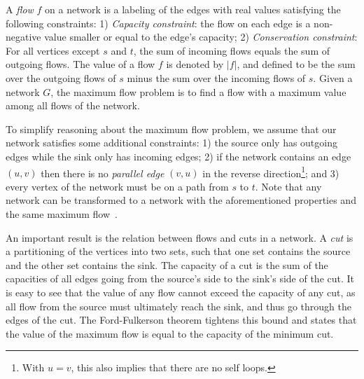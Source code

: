 \documentclass[smallcondensed]{svjour3}     %
\begin{document}
A \emph{flow} $f$ on a network is a labeling of the edges with real values satisfying the following constraints: 1) \emph{Capacity constraint}: the flow on each edge is a non-negative value smaller or equal to the edge's capacity; 2) \emph{Conservation constraint}: For all vertices except $s$ and $t$, the sum of incoming flows equals the 
sum of outgoing flows.
% 
The value of a flow $f$ is denoted by $|f|$, and defined to be the sum over the outgoing flows of $s$ minus the sum over the incoming flows of $s$.
Given a network $G$, the maximum flow problem is to find a flow with a maximum value among all flows of the network. 

To simplify reasoning about the maximum flow problem, we assume that our network satisfies some additional constraints: 1) the source only has outgoing edges while the sink only has incoming edges; 2) if the network contains an edge $(u, v)$ then there is no \emph{parallel edge} $(v, u)$ in the reverse direction\footnote{With $u=v$, this also implies that there are no self loops.}; and 3) every vertex of the network must be on a path from $s$ to $t$. Note that any network can be transformed to a network with the aforementioned properties and the same maximum flow~\cite{CLRS09}.


An important result is the relation between flows and cuts in a network. A \emph{cut} is a partitioning of the vertices into two sets, such that one set contains 
the source and the other set contains the sink. The capacity of a cut is the sum of the capacities of all edges going from the source's side to the sink's side of the cut.
It is easy to see that the value of any flow cannot exceed the capacity of any cut, as all flow from the source must ultimately reach the sink, and thus go through the edges of the cut. The Ford-Fulkerson theorem tightens this bound and states that the value of the maximum flow is equal to the capacity of the minimum cut.
\end{document}
